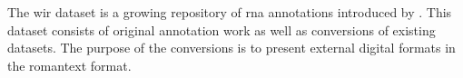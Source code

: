 

The \gls{wir} dataset is a growing repository of \gls{rna}
annotations
introduced by \textcite{gotham2019romantext,
gotham2022openscore}. This dataset consists of original
annotation work as well as conversions of existing datasets.
The purpose of the conversions is to present external
digital formats in the \gls{romantext} format.